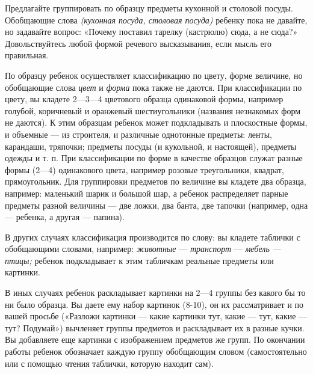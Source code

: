 \documentclass{book}
\renewcommand{\emph}[1]{\textit{#1}}
\begin{document}
Предлагайте группировать по образцу предметы кухонной и столовой посуды.
Обобщающие слова \emph{(кухонная посуда, столовая посуда)} ребенку пока
не давайте, но задавайте вопрос: «Почему поставил тарелку (кастрюлю)
сюда, а не сюда?» Довольствуйтесь любой формой речевого высказывания,
если мысль его правильная.

По образцу ребенок осуществляет классификацию по цвету, форме величине,
но обобщающие слова \emph{цвет} и \emph{форма} пока также не даются. При
классификации по цвету, вы кладете 2---3---4 цветового образца
одинаковой формы, например голубой, коричневый и оранжевый
шестиугольники (названия незнакомых форм не даются). К этим образцам
ребенок может подкладывать и плоскостные формы, и объемные --- из
строителя, и различные однотонные предметы: ленты, карандаши, тряпочки;
предметы посуды (и кукольной, и настоящей), предметы одежды и т. п. При
классификации по форме в качестве образцов служат разные формы (2---4)
одинакового цвета, например розовые треугольники, квадрат,
прямоугольник. Для группировки предметов по величине вы кладете два
образца, например: маленький шарик и большой шар, а ребенок распределяет
парные предметы разной величины --- две ложки, два банта, две тапочки
(например, одна --- ребенка, а другая --- папина).

В других случаях классификация производится по слову: вы кладете
таблички с обобщающими словами, например: \emph{животные} ---
\emph{транспорт} --- \emph{мебель --- птицы;} ребенок подкладывает к
этим табличкам реальные предметы или картинки.

В иных случаях ребенок раскладывает картинки на 2---4 группы без какого
бы то ни было образца. Вы даете ему набор картинок (8-10), он их
рассматривает и по вашей просьбе («Разложи картинки --- какие картинки
тут, какие --- тут, какие --- тут? Подумай») вычленяет группы предметов
и раскладывает их в разные кучки. Вы добавляете еще картинки с
изображением предметов же групп. По окончании работы ребенок обозначает
каждую группу обобщающим словом (самостоятельно или с помощью чтения
таблички, которую находит сам).
\end{document}
